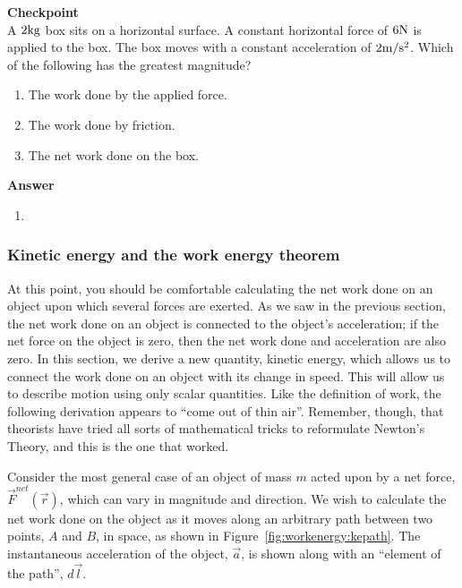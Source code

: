 \begin{framed}
\textbf{Checkpoint}\\
A $2 {\rm kg}$ box sits on a horizontal surface. A constant horizontal force of $6 {\rm N}$ is applied to the box. The box moves with a constant acceleration of $2 {\rm m/s^2}$. Which of the following has the greatest magnitude?

\begin{enumerate}
\item The work done by the applied force.
\item The work done by friction.
\item The net work done on the box.
\end{enumerate}

\begin{framed}
\textbf{Answer}\\
\begin{enumerate}
\item
\end{enumerate}
\end{framed}
\end{framed}

\subsubsection{Kinetic energy and the work energy theorem}\label{sec:workenergy:kinetic}

At this point, you should be comfortable calculating the net work done on an object upon which several forces are exerted. As we saw in the previous section, the net work done on an object is connected to the object's acceleration; if the net force on the object is zero, then the net work done and acceleration are also zero. In this section, we derive a new quantity, kinetic energy, which allows us to connect the work done on an object with its change in speed. This will allow us to describe motion using only scalar quantities. Like the definition of work, the following derivation appears to ``come out of thin air''. Remember, though, that theorists have tried all sorts of mathematical tricks to reformulate Newton's Theory, and this is the one that worked.

Consider the most general case of an object of mass $m$ acted upon by a net force, $\vec F^{net}(\vec r)$, which can vary in magnitude and direction. We wish to calculate the  net work done on the object as it moves along an arbitrary path between two points, $A$ and $B$, in space, as shown in Figure~\ref{fig:workenergy:kepath}. The instantaneous acceleration of the object, $\vec a$, is shown along with an ``element of the path'', $d\vec l$.

